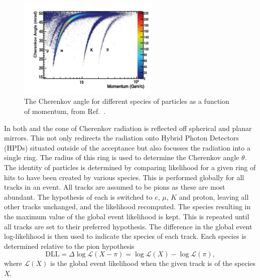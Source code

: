 \begin{figure}[!h]
    \centering
    \includegraphics[width=0.6\textwidth]{figs/Detector/rich_speices.pdf}
    \caption{The Cherenkov angle for different species of particles as a function of momentum, from Ref.~\cite{LHCb-DP-2012-003}.}
    \label{fig:Dec_rich_species}   
\end{figure}


In both \richone and \richtwo the cone of Cherenkov radiation is reflected off spherical and planar mirrors. This not only redirects the radiation onto Hybrid Photon Detectors (HPDs) situated outside of the acceptance but also focusses the radiation into a single ring.    
The radius of this ring is used to determine the Cherenkov angle $\theta$. 
The identity of particles is determined by comparing likelihood for a given ring of hits to have been created by various species. 
This is performed globally for all tracks in an event. All tracks are assumed to be pions as these are most abundant. The hypothesis of each is switched to $e$, $\mu$, $K$ and proton, leaving all other tracks unchanged, and the likelihood recomputed. The species resulting in the maximum value of the global event likelihood is kept. This is repeated until all tracks are set to their preferred hypothesis. 
The difference in the global event log-likelihood is then used to indicate the species of each track. Each species is determined relative to the pion hypothesis 
\begin{equation}
\text{DLL} = \Delta \log{\mathcal{L}(X-\pi)} = \log{\mathcal{L}(X)} - \log{\mathcal{L}(\pi)},
\end{equation}
where $\mathcal{L}(X)$ is the global event likelihood when the given track is of the species $X$.








